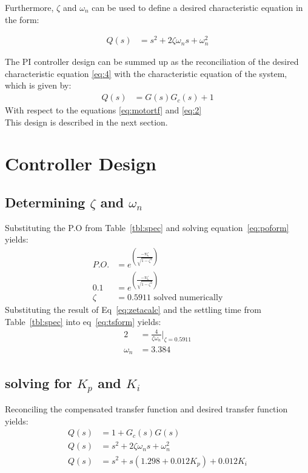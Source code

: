 Furthermore, $\zeta$ and $\omega_n$ can be used to define a desired characteristic equation in the form:

\begin{align} \label{eq:4}
Q(s) &= s^2 + 2\zeta\omega_ns + \omega_n^2
\end{align}

The PI controller design can be summed up as the reconciliation of the desired characteristic equation \ref{eq:4} with the characteristic equation of the system, which is given by:
\begin{align}\label{eq:5}
Q(s) &= G(s)G_c(s) + 1 
\end{align}
With respect to the equations \ref{eq:motortf} and \ref{eq:2}\\
This design is described in the next section.



\chapter{Controller Design}
\section{Determining $\zeta$ and $\omega_n$}
Substituting the P.O from Table~\ref{tbl:spec} and solving equation~\ref{eq:poform} yields:
\begin{align}
	\label{eq:zetacalc}
	P.O. &= e^{\left( \frac{-\pi\zeta}{\sqrt{1-\zeta^2}}\right)}\\
	0.1 &= e^{\left( \frac{-\pi\zeta}{\sqrt{1-\zeta^2}}\right)}\\
	\zeta &= 0.5911 \text{ solved numerically} 
\end{align}
Substituting the result of Eq~\ref{eq:zetacalc} and the settling time from Table~\ref{tbl:spec} into eq~\ref{eq:tsform} yields:
\begin{align}
	\label{eq:omegacalc}
	2 &= \frac{4}{\zeta\omega_n} \rvert_{\zeta = 0.5911}\\
	\omega_n &= 3.384
\end{align}

\section{solving for $K_p$ and $K_i$}
Reconciling the compensated transfer function and desired transfer function yields:
\begin{align}
	\label{eq:kpkichar}
Q(s) &= 1 + G_c(s)G(s) \\
Q(s)&= s^2 + 2\zeta\omega_ns + \omega_n^2\\
Q(s) &= s^2 + s(1.298 + 0.012K_p) + 0.012K_i 
\end{align}

